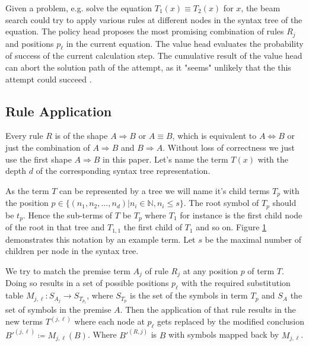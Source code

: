 \documentclass{scrartcl}
\theoremstyle{definition}
\begin{document}
Given a problem, e.g. solve the equation $T_1\left(x\right)\equiv T_2\left(x\right)$ for $x$,
the beam search could try to apply various rules at different nodes in the syntax tree of the equation.
The policy head proposes the most promising combination of rules $R_j$ and positions $p_\ell$ in the current equation.
The value head evaluates the probability of success of the current calculation step.
The cumulative result of the value head can abort the solution path of the attempt, as it "seems" unlikely that the this attempt could succeed \cite{44806}.

\subsection{Rule Application}

Every rule $R$ is of the shape $A \Longrightarrow B$ or $A \equiv B$, which is equivalent to $A \Longleftrightarrow B$ or just the combination of $A \Longrightarrow B$ and $B \Longrightarrow A$.
Without loss of correctness we just use the first shape $A \Longrightarrow B$ in this paper.
Let's name the term $T\left(x\right)$ with the depth $d$ of the corresponding syntax tree representation.

\begin{figure}[!htbp]
	\centering
	
	\label{fig:sxntax_tree}
\end{figure}

As the term $T$ can be represented by a tree we will name it's child terms $T_p$ with the position $p \in \big\{\left( n_1, n_2, \dots, n_d \right) | n_i \in \mathbb{N}, n_i \leq s \big\}$.
The root symbol of $T_p$ should be $t_p$.
Hence the sub-terms of $T$ be $T_p$ where $T_1$ for instance is the first child node of the root in that tree and $T_{1,1}$ the first child of $T_1$ and so on.
Figure \ref{fig:sxntax_tree} demonstrates this notation by an example term.
Let $s$ be the maximal number of children per node in the syntax tree.

We try to match the premise term $A_j$ of rule $R_j$ at any position $p$ of term $T$.
Doing so results in a set of possible positions $p_\ell$ with the required substitution table ${M_{j,\ell}: S_{A_j} \to S_{T_{p_\ell}}}$,
where $S_{T_{p}}$ is the set of the symbols in term $T_p$ and $S_A$ the set of symbols in the premise $A$.
Then the application of that rule results in the new terms $T^{(j,\ell)}$ where each node at $p_\ell$ gets replaced by the modified conclusion ${B'^{(j,\ell)} \coloneqq M_{j,\ell}\left( B \right)}$.
Where $B'^{(R,j)}$ is $B$ with symbols mapped back by $M_{j,\ell}$. 
\end{document}
